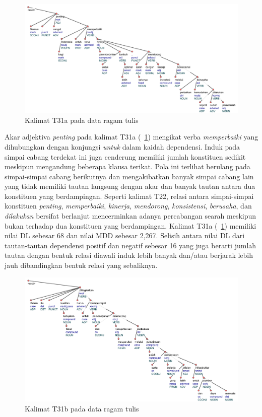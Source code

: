 \begin{figure}
	\centering \includegraphics[width=1
	\textwidth] {pics/ts2079.jpg} 
	\caption{Kalimat T31a pada data ragam tulis} 
	\label{fig:ts2079} 
\end{figure}

Akar adjektiva \textit{penting} pada kalimat T31a (\pic~\ref{fig:ts2079}) mengikat verba \textit{memperbaiki} yang dihubungkan dengan konjungsi \textit{untuk} dalam kaidah dependensi. Induk pada simpai cabang terdekat ini juga cenderung memiliki jumlah konstituen sedikit meskipun mengandung beberapa klausa terikat. Pola ini terlihat berulang pada simpai-simpai cabang berikutnya dan mengakibatkan banyak simpai cabang lain yang tidak memiliki tautan langsung dengan akar dan banyak tautan antara dua konstituen yang berdampingan. Seperti kalimat T22, relasi antara simpai-simpai konstituen \textit{penting}, \textit{memperbaiki}, \textit{kinerja}, \textit{mendorong}, \textit{konsistensi}, \textit{berusaha}, dan \textit{dilakukan} bersifat berlanjut mencerminkan adanya percabangan searah meskipun bukan terhadap dua konstituen yang berdampingan. Kalimat T31a (\pic~\ref{fig:ts2079}) memiliki nilai DL sebesar 68 dan nilai MDD sebesar 2,267. Selisih antara nilai DL dari tautan-tautan dependensi positif dan negatif sebesar 16 yang juga berarti jumlah tautan dengan bentuk relasi diawali induk lebih banyak dan/atau berjarak lebih jauh dibandingkan bentuk relasi yang sebaliknya.

\begin{figure}
	\centering \includegraphics[width=1
	\textwidth] {pics/ts2081.jpg} 
	\caption{Kalimat T31b pada data ragam tulis} 
	\label{fig:ts2081} 
\end{figure}

